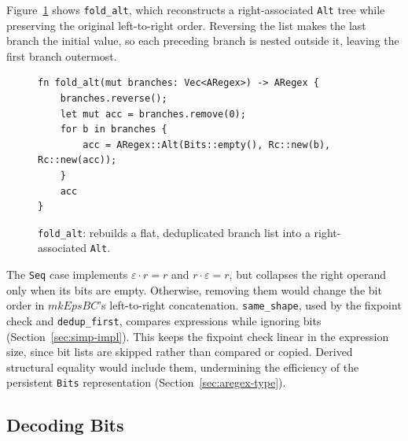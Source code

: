 %

Figure~\ref{fig:fold-alt-rust} shows \texttt{fold\_alt}, 
which reconstructs a right-associated \texttt{Alt} tree 
while preserving the original left-to-right order. 
Reversing the list makes the last branch the initial value, 
so each preceding branch is nested outside it, 
leaving the first branch outermost.
\begin{figure}[H]
\small
\begin{verbatim}
fn fold_alt(mut branches: Vec<ARegex>) -> ARegex {
    branches.reverse();
    let mut acc = branches.remove(0);
    for b in branches {
        acc = ARegex::Alt(Bits::empty(), Rc::new(b), Rc::new(acc));
    }
    acc
}
\end{verbatim}
\caption{\texttt{fold\_alt}: rebuilds a flat, 
deduplicated branch list into a right-associated \texttt{Alt}.}
\label{fig:fold-alt-rust}
\end{figure}

The \texttt{Seq} case implements $\varepsilon \cdot r = r$ 
and $r \cdot \varepsilon = r$, 
but collapses the right operand only when its bits are empty. 
Otherwise, removing them would change the bit order 
in $\mathit{mkEpsBC}$'s left-to-right concatenation.
\texttt{same\_shape}, used by the fixpoint check and \texttt{dedup\_first}, 
compares expressions while ignoring bits (Section~\ref{sec:simp-impl}). 
This keeps the fixpoint check linear in the expression size, 
since bit lists are skipped rather than compared or copied. 
Derived structural equality would include them,
undermining the efficiency of the persistent \texttt{Bits} representation 
(Section~\ref{sec:aregex-type}).

%
%
%

\subsection{Decoding Bits}
\label{sec:decode}

